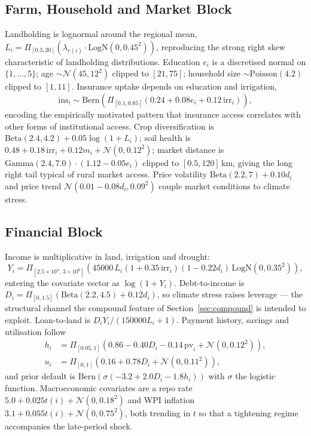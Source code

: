 \documentclass[journal]{IEEEtran}
\begin{document}
\subsection{Farm, Household and Market Block}
Landholding is lognormal around the regional mean, $L_i=\Pi_{[0.3,20]}(\lambda_{r(i)}\cdot\text{LogN}(0,0.45^2))$, reproducing the strong right skew characteristic of landholding distributions. Education $e_i$ is a discretised normal on $\{1,\dots,5\}$; age $\sim\mathcal{N}(45,12^2)$ clipped to $[21,75]$; household size $\sim\text{Poisson}(4.2)$ clipped to $[1,11]$. Insurance uptake depends on education and irrigation,
\begin{equation}
\text{ins}_i\sim\text{Bern}\!\left(\Pi_{[0.1,0.85]}(0.24+0.08 e_i+0.12\,\text{irr}_i)\right),
\label{eq:ins}
\end{equation}
encoding the empirically motivated pattern that insurance access correlates with other forms of institutional access. Crop diversification is $\text{Beta}(2.4,4.2)+0.05\log(1+L_i)$; soil health is $0.48+0.18\,\text{irr}_i+0.12 m_i+\mathcal{N}(0,0.12^2)$; market distance is $\text{Gamma}(2.4,7.0)\cdot(1.12-0.05e_i)$ clipped to $[0.5,120]$\,km, giving the long right tail typical of rural market access. Price volatility $\text{Beta}(2.2,7)+0.10 d_i$ and price trend $\mathcal{N}(0.01-0.08 d_i,0.09^2)$ couple market conditions to climate stress.

\subsection{Financial Block}
Income is multiplicative in land, irrigation and drought:
\begin{equation}
Y_i=\Pi_{[2.5\!\times\!10^4,\,3\!\times\!10^6]}\!\left(45000\,L_i(1+0.35\,\text{irr}_i)(1-0.22 d_i)\,\text{LogN}(0,0.35^2)\right),
\label{eq:income}
\end{equation}
entering the covariate vector as $\log(1+Y_i)$. Debt-to-income is $D_i=\Pi_{[0,1.5]}(\text{Beta}(2.2,4.5)+0.12 d_i)$, so climate stress raises leverage --- the structural channel the compound feature of Section~\ref{sec:compound} is intended to exploit. Loan-to-land is $D_iY_i/(150000L_i+1)$. Payment history, savings and utilisation follow
\begin{align}
h_i &= \Pi_{[0.05,1]}\!\left(0.86-0.40 D_i-0.14\,\text{pv}_i+\mathcal{N}(0,0.12^2)\right),\\
u_i &= \Pi_{[0,1]}\!\left(0.16+0.78 D_i+\mathcal{N}(0,0.11^2)\right),
\end{align}
and prior default is $\text{Bern}(\sigma(-3.2+2.0D_i-1.8h_i))$ with $\sigma$ the logistic function. Macroeconomic covariates are a repo rate $5.0+0.025t(i)+\mathcal{N}(0,0.18^2)$ and WPI inflation $3.1+0.055t(i)+\mathcal{N}(0,0.75^2)$, both trending in $t$ so that a tightening regime accompanies the late-period shock.
\end{document}

